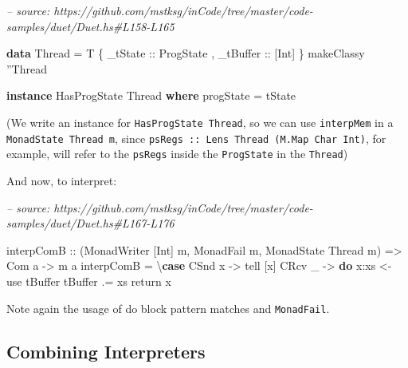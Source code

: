 \documentclass[]{article}
\newenvironment{Shaded}{}{}
\newcommand{\CharTok}[1]{\textcolor[rgb]{0.25,0.44,0.63}{#1}}
\newcommand{\CommentTok}[1]{\textcolor[rgb]{0.38,0.63,0.69}{\textit{#1}}}
\newcommand{\DataTypeTok}[1]{\textcolor[rgb]{0.56,0.13,0.00}{#1}}
\newcommand{\FunctionTok}[1]{\textcolor[rgb]{0.02,0.16,0.49}{#1}}
\newcommand{\KeywordTok}[1]{\textcolor[rgb]{0.00,0.44,0.13}{\textbf{#1}}}
\newcommand{\NormalTok}[1]{#1}
\newcommand{\OtherTok}[1]{\textcolor[rgb]{0.00,0.44,0.13}{#1}}
\begin{document}
\begin{Shaded}
\begin{Highlighting}[]
\CommentTok{-- source: https://github.com/mstksg/inCode/tree/master/code-samples/duet/Duet.hs#L158-L165}

\KeywordTok{data} \DataTypeTok{Thread} \FunctionTok{=} \DataTypeTok{T}
\NormalTok{    \{}\OtherTok{ _tState   ::} \DataTypeTok{ProgState}
\NormalTok{    ,}\OtherTok{ _tBuffer  ::}\NormalTok{ [}\DataTypeTok{Int}\NormalTok{]}
\NormalTok{    \}}
\NormalTok{makeClassy }\CharTok{''}\DataTypeTok{Thread}

\KeywordTok{instance} \DataTypeTok{HasProgState} \DataTypeTok{Thread} \KeywordTok{where}
\NormalTok{    progState }\FunctionTok{=}\NormalTok{ tState}
\end{Highlighting}
\end{Shaded}

(We write an instance for \texttt{HasProgState\ Thread}, so we can use
\texttt{interpMem} in a \texttt{MonadState\ Thread\ m}, since
\texttt{psRegs\ ::\ Lens\textquotesingle{}\ Thread\ (M.Map\ Char\ Int)}, for
example, will refer to the \texttt{psRegs} inside the \texttt{ProgState} in the
\texttt{Thread})

And now, to interpret:

\begin{Shaded}
\begin{Highlighting}[]
\CommentTok{-- source: https://github.com/mstksg/inCode/tree/master/code-samples/duet/Duet.hs#L167-L176}

\NormalTok{interpComB}
\OtherTok{    ::}\NormalTok{ (}\DataTypeTok{MonadWriter}\NormalTok{ [}\DataTypeTok{Int}\NormalTok{] m, }\DataTypeTok{MonadFail}\NormalTok{ m, }\DataTypeTok{MonadState} \DataTypeTok{Thread}\NormalTok{ m)}
    \OtherTok{=>} \DataTypeTok{Com}\NormalTok{ a}
    \OtherTok{->}\NormalTok{ m a}
\NormalTok{interpComB }\FunctionTok{=}\NormalTok{ \textbackslash{}}\KeywordTok{case}
    \DataTypeTok{CSnd}\NormalTok{ x }\OtherTok{->}\NormalTok{ tell [x]}
    \DataTypeTok{CRcv}\NormalTok{ _ }\OtherTok{->} \KeywordTok{do}
\NormalTok{      x}\FunctionTok{:}\NormalTok{xs }\OtherTok{<-}\NormalTok{ use tBuffer}
\NormalTok{      tBuffer }\FunctionTok{.=}\NormalTok{ xs}
\NormalTok{      return x}
\end{Highlighting}
\end{Shaded}

Note again the usage of do block pattern matches and \texttt{MonadFail}.

\hypertarget{combining-interpreters}{%
\subsection{Combining Interpreters}\label{combining-interpreters}}
\end{document}
